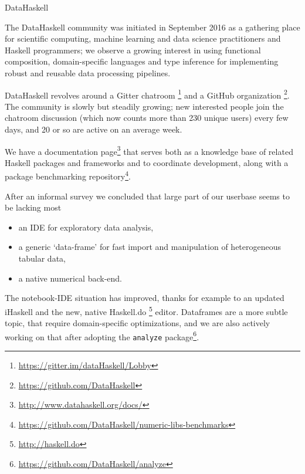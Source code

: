 \documentclass[DIV16,twocolumn,10pt]{scrreprt}
\begin{document}
\begin{hcarentry}{DataHaskell}
\makeheader

The DataHaskell community was initiated in September 2016 as a gathering place for scientific computing, machine learning and data science practitioners and Haskell programmers; we observe a growing interest in using functional composition, domain-specific languages and type inference for implementing robust and reusable data processing pipelines.

DataHaskell revolves around a Gitter chatroom \footnote{\url{https://gitter.im/dataHaskell/Lobby}} and a GitHub organization \footnote{\url{https://github.com/DataHaskell}}. The community is slowly but steadily growing; new interested people join the chatroom discussion (which now counts more than 230 unique users) every few days, and 20 or so are active on an average week.

We have a documentation page\footnote{\url{http://www.datahaskell.org/docs/}} that serves both as a knowledge base of related Haskell packages and frameworks and to coordinate development, along with a package benchmarking repository\footnote{\url{https://github.com/DataHaskell/numeric-libs-benchmarks}}.

After an informal survey we concluded that large part of our userbase seems to be lacking most
\begin{itemize} 
\item an IDE for exploratory data analysis,
\item a generic `data-frame' for fast import and manipulation of heterogeneous tabular data,
\item a native numerical back-end.
\end{itemize}

The notebook-IDE situation has improved, thanks for example to an updated iHaskell and the new, native Haskell.do \footnote{\url{http://haskell.do}} editor. Dataframes are a more subtle topic, that require domain-specific optimizations, and we are also actively working on that after adopting the \texttt{analyze} package\footnote{\url{https://github.com/DataHaskell/analyze}}.


\end{hcarentry}
\end{document}
